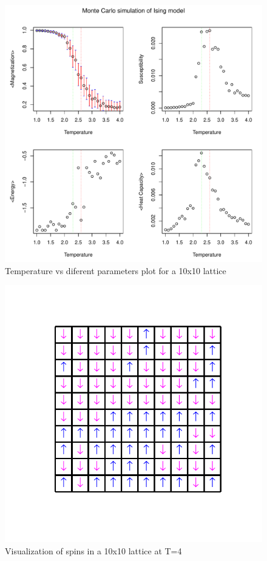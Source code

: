 \documentclass[]{article}
\begin{document}
\begin{figure}[p]
  \centering
  \includegraphics[scale=0.8]{figures/fig_5}%
  \caption{\label{fig:epsart} Temperature vs diferent parameters plot for a 10x10 lattice}
\end{figure}
\begin{figure}[p]
  \centering
  \includegraphics[scale=0.5]{figures/fig_6}%
  \caption{\label{fig:epsart} Visualization of spins in a 10x10 lattice at T=4}
\end{figure}
\end{document}
